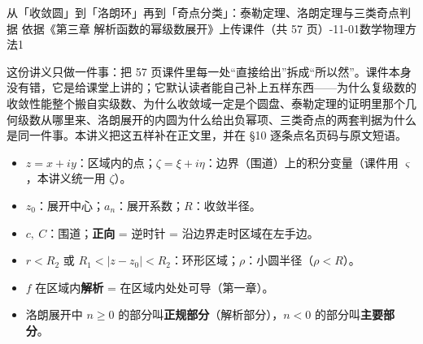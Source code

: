 \documentclass[11pt]{ctexart}
\let\origsubhdr\subhdr
\renewcommand{\subhdr}[1]{\par\needspace{4\baselineskip}\origsubhdr{#1}}
\let\orighdr\hdr
\renewcommand{\hdr}[2]{\par\needspace{9\baselineskip}\orighdr{#1}{#2}}
\begin{document}
{从「收敛圆」到「洛朗环」再到「奇点分类」：泰勒定理、洛朗定理与三类奇点判据}
{依据《第三章 解析函数的幂级数展开》上传课件（共 57 页）-11-01\quad 数学物理方法1}


这份讲义只做一件事：把 57 页课件里每一处“直接给出”拆成“所以然”。课件本身没有错，它是给课堂上讲的；它默认读者能自己补上五样东西——为什么复级数的收敛性能整个搬自实级数、为什么收敛域一定是个圆盘、泰勒定理的证明里那个几何级数从哪里来、洛朗展开的内圆为什么给出负幂项、三类奇点的两套判据为什么是同一件事。本讲义把这五样补在正文里，并在 §10 逐条点名页码与原文短语。


\begin{itemize}
\item $z=x+iy$：区域内的点；$\zeta=\xi+i\eta$：边界（围道）上的积分变量（课件用 $\varsigma$，本讲义统一用 $\zeta$）。
\item $z_0$：展开中心；$a_n$：展开系数；$R$：收敛半径。
\item $c,\ C$：围道；\textbf{正向} = 逆时针 = 沿边界走时区域在左手边。
\item $r<R_2$ 或 $R_1<|z-z_0|<R_2$：环形区域；$\rho$：小圆半径（$\rho<R$）。
\item $f$ 在区域内\textbf{解析} = 在区域内处处可导（第一章）。
\item 洛朗展开中 $n\ge 0$ 的部分叫\textbf{正规部分}（解析部分），$n<0$ 的部分叫\textbf{主要部分}。
\end{itemize}





\end{document}
